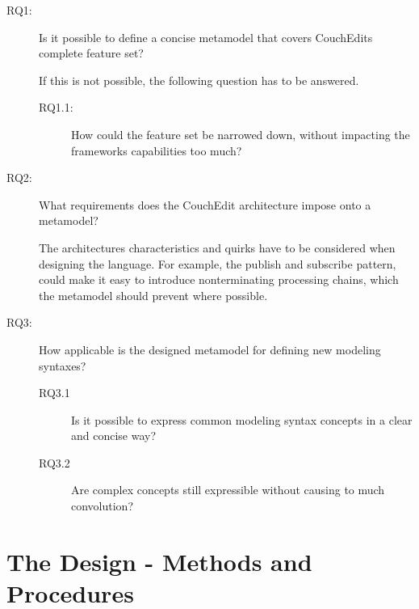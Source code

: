 \documentclass[10pt,a4paper,oneside]{scrartcl}
\newcommand\hint[2]{
\ifthenelse{\boolean{showhints}}{
\begin{center}
\colorbox{black!10}{
\begin{minipage}{.963\textwidth}
#2\hfill\textbf{#1}
\end{minipage}
}\end{center}}{}
}
\begin{document}
\begin{description}
  \item[RQ1:] Is it possible to define a concise metamodel that covers CouchEdits complete feature set?

        If this is not possible, the following question has to be answered.
        \begin{description}
          \item[RQ1.1:] How could the feature set be narrowed down, without impacting the frameworks capabilities too much?
        \end{description}

  \item[RQ2:] What requirements does the CouchEdit architecture impose onto a metamodel?

        The architectures characteristics and quirks have to be considered when designing the language. For example, the publish and subscribe pattern, could make it easy to introduce nonterminating processing chains, which the metamodel should prevent where possible.

  \item[RQ3:] How applicable is the designed metamodel for defining new modeling syntaxes?

        \begin{description}
          \item[RQ3.1] Is it possible to express common modeling syntax concepts in a clear and concise way?
          \item[RQ3.2] Are complex concepts still expressible without causing to much convolution?
        \end{description}
\end{description}

\section{The Design - Methods and Procedures}
\label{sec:approach}

\end{document}
